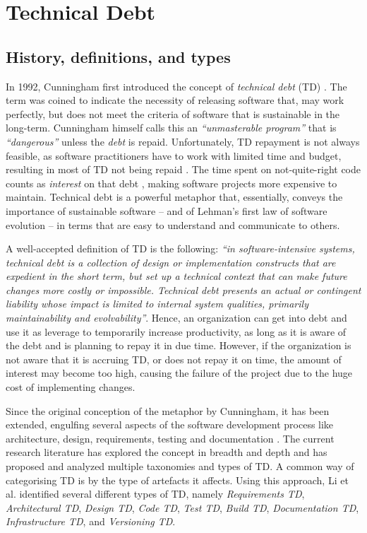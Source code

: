 \section{Technical Debt}
\subsection{History, definitions, and types}
In 1992, Cunningham first introduced the concept of \emph{technical debt} (TD) \cite{Cunningham1992}. 
The term was coined to indicate the necessity of releasing software that, may work perfectly, but does not meet the criteria of software that is sustainable in the long-term. 
Cunningham himself calls this an \emph{``unmasterable program''} that is \emph{``dangerous''} unless the \emph{debt} is repaid.
Unfortunately, TD repayment is not always feasible, as software practitioners have to work with limited time and budget, resulting in most of TD not being repaid \cite{Digkas2018}.
The time spent on not-quite-right code counts as \emph{interest} on that debt \cite{Cunningham1992}, making software projects more expensive to maintain.
Technical debt is a powerful metaphor that, essentially, conveys the importance of sustainable software -- and of Lehman's first law of software evolution -- in terms that are easy to understand and communicate to others. 


A well-accepted definition of TD is the following: 
\emph{``in software-intensive systems, technical debt is a collection of design or implementation constructs that are expedient in the short term, but set up a technical context that can make future changes more costly or impossible. Technical debt presents an actual or contingent liability whose impact is limited to internal system qualities, primarily maintainability and evolvability''}\cite{Avgeriou2016}. 
Hence, an organization can get into debt and use it as leverage to temporarily increase productivity, as long as it is aware of the debt and is planning to repay it in due time.
However, if the organization is not aware that it is accruing TD, or does not repay it on time, the amount of interest may become too high, causing the failure of the project due to the huge cost of implementing changes.

Since the original conception of the metaphor by Cunningham, it has been extended, engulfing several aspects of the software development process like architecture, design, requirements, testing and documentation \cite{Brown2010}.
The current research literature has explored the concept in breadth and depth and has proposed and analyzed multiple taxonomies and types of TD.
A common way of categorising TD is by the type of artefacts it affects. Using this approach, Li et al. \cite{Li2015} identified several different types of TD, namely \emph{Requirements TD}, \emph{Architectural TD}, \emph{Design TD}, \emph{Code TD}, \emph{Test TD}, \emph{Build TD}, \emph{Documentation TD}, \emph{Infrastructure TD}, and \emph{Versioning TD}.

